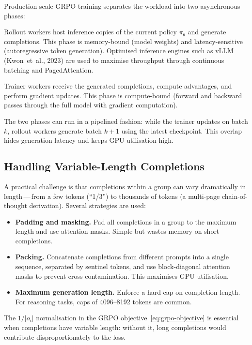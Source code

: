 Production-scale GRPO training separates the workload into two asynchronous phases:
\begin{description}[leftmargin=!,labelwidth=3.5cm]
  \item[Generation phase] Rollout workers host inference copies of the current policy $\pi_\theta$ and generate completions.  This phase is memory-bound (model weights) and latency-sensitive (autoregressive token generation).  Optimised inference engines such as vLLM (Kwon~et~al., 2023) are used to maximise throughput through continuous batching and PagedAttention.
  \item[Training phase] Trainer workers receive the generated completions, compute advantages, and perform gradient updates.  This phase is compute-bound (forward and backward passes through the full model with gradient computation).
\end{description}
The two phases can run in a pipelined fashion: while the trainer updates on batch $k$, rollout workers generate batch $k+1$ using the latest checkpoint.  This overlap hides generation latency and keeps GPU utilisation high.

\subsection{Handling Variable-Length Completions}

A practical challenge is that completions within a group can vary dramatically in length\,---\,from a few tokens (``1/3'') to thousands of tokens (a multi-page chain-of-thought derivation).  Several strategies are used:
\begin{itemize}[leftmargin=*]
  \item \textbf{Padding and masking.}  Pad all completions in a group to the maximum length and use attention masks.  Simple but wastes memory on short completions.
  \item \textbf{Packing.}  Concatenate completions from different prompts into a single sequence, separated by sentinel tokens, and use block-diagonal attention masks to prevent cross-contamination.  This maximises GPU utilisation.
  \item \textbf{Maximum generation length.}  Enforce a hard cap on completion length.  For reasoning tasks, caps of 4096--8192 tokens are common.
\end{itemize}
The $1/|o_i|$ normalisation in the GRPO objective~\eqref{eq:grpo-objective} is essential when completions have variable length: without it, long completions would contribute disproportionately to the loss.

